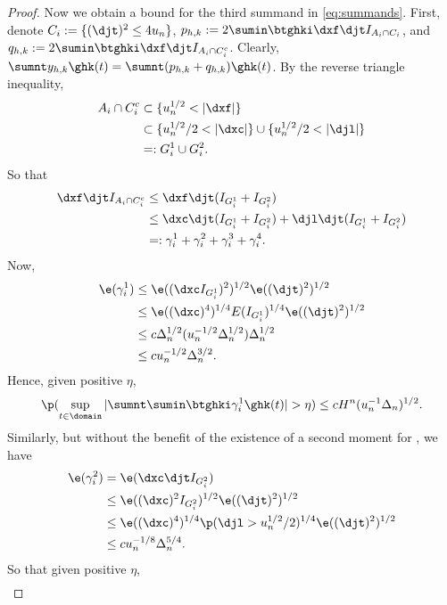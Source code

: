 \begin{proof}
Now we obtain a bound for the third summand in  \eqref{eq:summands}. First, denote $C_i := \{( \djt )^2 \le 4 u_n\}$, $p_{h,k} : = 2 \sumin \btghki\dxf \djt I_{A_i \cap C_i}$, and $q_{h,k} := 2 \sumin \btghki\dxf \djt I_{A_i \cap C_i^c}$. Clearly, $\sumnt y_{h,k} \ghk(t)  = \sumnt (p_{h,k} + q_{h,k}) \ghk(t)$. By the reverse triangle inequality,
\begin{align}
  A_i \cap C_i^c &\subset \{ u_n^{1/2} < \vert \dxf \vert  \}\notag\\
  & \subset \{ u_n^{1/2}/2 < \vert \dxc \vert  \} \cup  \{ u_n^{1/2}/2 < \vert \djl \vert  \}\notag\\
  &=: G^1_i \cup G^2_i\notag.
  \label{}
\end{align}
So that 
\begin{align}
  \dxf \djt I_{A_i \cap C_i^c} &\le \dxf \djt  (I_{G^1_i} +  I_{G^2_i}) \notag\\
  & \le \dxc \djt(I_{G^1_i} +  I_{G^2_i}) + \djl \djt(I_{G^1_i} +  I_{G^2_i}) \notag \\
  & =: \gamma_i^1 + \gamma_i^2 + \gamma_i^3 + \gamma^4_i.\notag 
\end{align}
Now,
\begin{align}
  \e(\gamma_i^1) &\le  \e( (\dxc  I_{G^1_i})^2)^{1/2} \e( (\djt)^2)^{1/2} \notag\\
  &\le  \e( (\dxc)^4)^{1/4}  E(I_{G^1_i})^{1/4} \e( (\djt)^2)^{1/2} \notag\\
  & \le c \Delta_n^{1/2} (u^{-1/2}_n \Delta_n^{1/2}) \Delta_n^{1/2} \notag \\
  & \le c u^{-1/2}_n \Delta_n^{3/2}.
  \label{}
\end{align}
Hence, given positive $\eta$, 
\begin{align} 
  \p( \sup_{t \in \domain}\vert \sumnt \sumin \btghki \gamma^1_i \ghk(t)\vert > \eta) \le cH^n (u^{-1}_n\Delta_n)^{1/2}. \notag \end{align}
Similarly, but without the benefit of the existence of a second moment for \djl, we have 
\begin{align}
  \e(\gamma_i^2) & =  \e(\dxc \djt I_{G^2_i}) \notag\\
  & \le \e((\dxc)^2 I_{G^2_i})^{1/2} \e((\djt)^2)^{1/2}\notag \\
  &\le \e((\dxc)^4)^{1/4} \p(\djl > u_n^{1/2}/2)^{1/4} \e((\djt)^2)^{1/2}\notag\\
  & \le  c u^{-1/8}_n \Delta_n^{5/4}\notag.
  \label{}
\end{align}
So that given positive $\eta$,
\begin{align} 

\end{align}
\end{proof}
